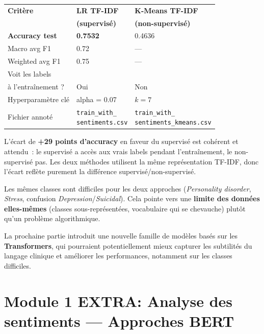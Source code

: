 \documentclass[12pt,a4paper]{report}
\renewcommand{\arraystretch}{1}
\begin{document}
\begin{center}
\renewcommand{\arraystretch}{1.2}
\begin{tabular}{@{}lC{5cm}C{5cm}@{}}
\toprule
\textbf{Critère} & \textbf{LR TF-IDF } & \textbf{K-Means TF-IDF} \\
                 & \textbf{(supervisé)} & \textbf{(non-supervisé)} \\
\midrule
\textbf{Accuracy test}          & \textbf{0.7532} & 0.4636 \\
Macro avg F1                    & 0.72            & ---    \\
Weighted avg F1                 & 0.75            & ---    \\
Voit les labels                 &                 &    \\
 à l'entraînement ?             & Oui             & Non    \\
Hyperparamètre clé              & alpha = 0.07    & $k = 7$ \\
Fichier annoté                  & \texttt{train\_with\_\newline sentiments.csv} & \texttt{train\_with\_\newline sentiments\_kmeans.csv} \\
\bottomrule
\end{tabular}
\end{center}

L'écart de \textbf{+29 points d'accuracy} en faveur du supervisé est cohérent et attendu~: le supervisé a accès aux vrais labels pendant l'entraînement, le non-supervisé pas. Les deux méthodes utilisent la même représentation TF-IDF, donc l'écart reflète purement la différence supervisé/non-supervisé.

\begin{warn}[Remarque]
Les mêmes classes sont difficiles pour les deux approches (\textit{Personality disorder}, \textit{Stress}, confusion \textit{Depression}/\textit{Suicidal}). Cela pointe vers une \textbf{limite des données elles-mêmes} (classes sous-représentées, vocabulaire qui se chevauche) plutôt qu'un problème algorithmique.
\end{warn}

La prochaine partie introduit une nouvelle famille de modèles basés sur les \textbf{Transformers}, qui pourraient potentiellement mieux capturer les subtilités du langage clinique et améliorer les performances, notamment sur les classes difficiles.

\pagebreak

\chapter{Module 1 EXTRA: Analyse des sentiments — Approches BERT}
\end{document}
